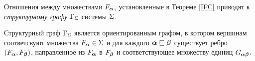 % 
% 

%
%
%
%
%

Отношения между множествами $F_{\bm{\alpha}}$, установленные в Теореме \ref{IFC} приводят к {\em структурному графу $\Gamma_\Sigma$} системы $\Sigma$. 

\begin{definition}
Структурный граф $\Gamma_\Sigma$ является ориентированным графом, в котором вершинам соответсвуют множества $F_{\bm{\alpha}}\in\Sigma$ и для каждого ${\bm{\alpha}}\sqsubseteq{\bm{\beta}}$ существует ребро $(F_{\bm{\alpha}},F_{\bm{\beta}})$, направленное из $F_{\bm{\alpha}}$ в $F_{\bm{\beta}}$ и соответствующее множеству единиц $G_{{\bm{\alpha}}{\bm{\beta}}}$.
\end{definition}


